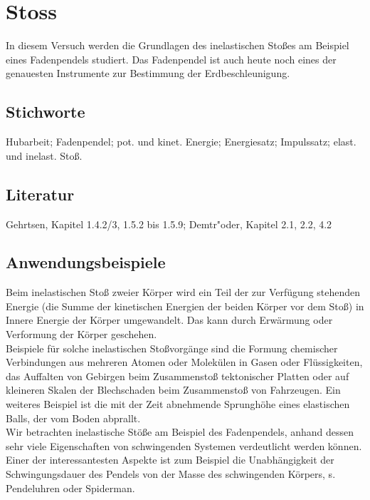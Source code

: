 \chapter{Stoss}
\label{v:1}

In diesem Versuch werden die Grundlagen des inelastischen Sto{\ss}es am Beispiel eines Fadenpendels studiert. Das Fadenpendel ist auch heute noch eines der genauesten Instrumente zur Bestimmung der Erdbeschleunigung.


\section{Stichworte}
Hubarbeit; Fadenpendel; pot. und kinet. Energie; Energiesatz; Impulssatz; elast. und inelast. Sto{\ss}.
%
\section{Literatur}
Gehrtsen, Kapitel 1.4.2/3, 1.5.2 bis 1.5.9; Demtr"oder, Kapitel 2.1, 2.2, 4.2
%
\section{Anwendungsbeispiele}
%
Beim inelastischen Stoß zweier Körper wird ein Teil der zur Verfügung stehenden Energie (die Summe der kinetischen Energien der beiden Körper vor dem Stoß) in Innere Energie der Körper umgewandelt. Das kann durch Erwärmung oder Verformung der Körper geschehen.\\
Beispiele für solche inelastischen Stoßvorgänge sind die Formung chemischer Verbindungen aus mehreren Atomen oder Molekülen in Gasen oder Flüssigkeiten, das Auffalten von Gebirgen beim Zusammensto{\ss} tektonischer Platten oder auf kleineren Skalen der Blechschaden beim Zusammensto{\ss} von Fahrzeugen. Ein weiteres Beispiel ist die mit der Zeit abnehmende Sprunghöhe eines elastischen Balls, der vom Boden abprallt.\\
Wir betrachten inelastische Stöße am Beispiel des Fadenpendels, anhand dessen sehr viele Eigenschaften von schwingenden Systemen verdeutlicht werden können. Einer der interessantesten Aspekte ist zum Beispiel die Unabhängigkeit der Schwingungsdauer des Pendels von der Masse des schwingenden Körpers, s. Pendeluhren oder Spiderman.\\

